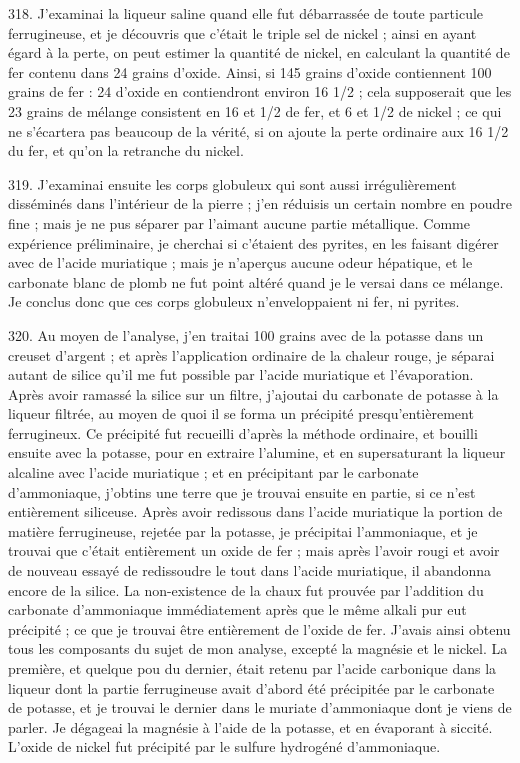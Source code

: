 \documentclass[a4paper, 11pt, oneside, polutonikogreek, french]{article}
\begin{document}
318. J'examinai la liqueur saline quand elle fut débarrassée de toute particule ferrugineuse, et je découvris que c'était le triple sel de nickel ; ainsi en ayant égard à la perte, on peut estimer la quantité de nickel, en calculant la quantité de fer contenu dans 24 grains d'oxide. Ainsi, si 145 grains d'oxide contiennent 100 grains de fer : 24 d'oxide en contiendront environ 16 1/2 ; cela supposerait que les 23 grains de mélange consistent en 16 et 1/2 de fer, et 6 et 1/2 de nickel ; ce qui ne s'écartera pas beaucoup de la vérité, si on ajoute la perte ordinaire aux 16 1/2 du fer, et qu'on la retranche du nickel.

319. J'examinai ensuite les corps globuleux qui sont aussi irrégulièrement disséminés dans l'intérieur de la pierre ; j'en réduisis un certain nombre en poudre fine ; mais je ne pus séparer par l'aimant aucune partie métallique. Comme expérience préliminaire, je cherchai si c'étaient des pyrites, en les faisant digérer avec de l'acide muriatique ; mais je n'aperçus aucune odeur hépatique, et le carbonate blanc de plomb ne fut point altéré quand je le versai dans ce mélange. Je conclus donc que ces corps globuleux n'enveloppaient ni fer, ni pyrites.

320. Au moyen de l'analyse, j'en traitai 100 grains avec de la potasse dans un creuset d'argent ; et après l'application ordinaire de la chaleur rouge, je séparai autant de silice qu'il me fut possible par l'acide muriatique et l'évaporation. Après avoir ramassé la silice sur un filtre, j'ajoutai du carbonate de potasse à la liqueur filtrée, au moyen de quoi il se forma un précipité presqu'entièrement ferrugineux. Ce précipité fut recueilli d'après la méthode ordinaire, et bouilli ensuite avec la potasse, pour en extraire l'alumine, et en supersaturant la liqueur alcaline avec l'acide muriatique ; et en précipitant par le carbonate d'ammoniaque, j'obtins une terre que je trouvai ensuite en partie, si ce n'est entièrement siliceuse. Après avoir redissous dans l'acide muriatique la portion de matière ferrugineuse, rejetée par la potasse, je précipitai l'ammoniaque, et je trouvai que c'était entièrement un oxide de fer ; mais après l'avoir rougi et avoir de nouveau essayé de redissoudre le tout dans l'acide muriatique, il abandonna encore de la silice. La non-existence de la chaux fut prouvée par l'addition du carbonate d'ammoniaque immédiatement après que le même alkali pur eut précipité ; ce que je trouvai être entièrement de l'oxide de fer. J'avais ainsi obtenu tous les composants du sujet de mon analyse, excepté la magnésie et le nickel. La première, et quelque pou du dernier, était retenu par l'acide carbonique dans la liqueur dont la partie ferrugineuse avait d'abord été précipitée par le carbonate de potasse, et je trouvai le dernier dans le muriate d'ammoniaque dont je viens de parler. Je dégageai la magnésie à l'aide de la potasse, et en évaporant à siccité. L'oxide de nickel fut précipité par le sulfure hydrogéné d'ammoniaque.
\end{document}
